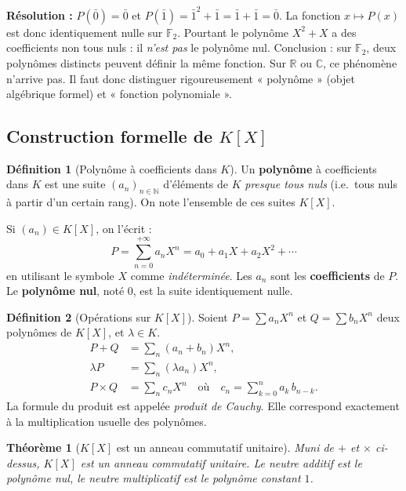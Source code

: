 \documentclass[12pt,a4paper]{report}
\newtheorem{theoreme}{Théorème}[section]
\theoremstyle{definition}
\newtheorem{definition}{Définition}[section]
\theoremstyle{remark}
\begin{document}
\textbf{Résolution :} $P(\bar{0}) = \bar{0}$ et $P(\bar{1}) = \bar{1}^2 + \bar{1} = \bar{1} + \bar{1} = \bar{0}$. La fonction $x \mapsto P(x)$ est donc identiquement nulle sur $\mathbb{F}_2$. Pourtant le polynôme $X^2 + X$ a des coefficients non tous nuls : il \emph{n'est pas} le polynôme nul. Conclusion : sur $\mathbb{F}_2$, deux polynômes distincts peuvent définir la même fonction. Sur $\mathbb{R}$ ou $\mathbb{C}$, ce phénomène n'arrive pas. Il faut donc distinguer rigoureusement « polynôme » (objet algébrique formel) et « fonction polynomiale ».

\subsection{Construction formelle de $K[X]$}

\begin{definition}[Polynôme à coefficients dans $K$]
Un \textbf{polynôme} à coefficients dans $K$ est une suite $(a_n)_{n \in \mathbb{N}}$ d'éléments de $K$ \emph{presque tous nuls} (i.e.\ tous nuls à partir d'un certain rang). On note l'ensemble de ces suites $K[X]$.

Si $(a_n) \in K[X]$, on l'écrit :
\[ P = \sum_{n=0}^{+\infty} a_n X^n = a_0 + a_1 X + a_2 X^2 + \cdots \]
en utilisant le symbole $X$ comme \emph{indéterminée}. Les $a_n$ sont les \textbf{coefficients} de $P$. Le \textbf{polynôme nul}, noté $0$, est la suite identiquement nulle.
\end{definition}

\begin{definition}[{Opérations sur $K[X]$}]
Soient $P = \sum a_n X^n$ et $Q = \sum b_n X^n$ deux polynômes de $K[X]$, et $\lambda \in K$.
\begin{align*}
P + Q &= \sum_{n} (a_n + b_n) X^n, \\
\lambda P &= \sum_{n} (\lambda a_n) X^n, \\
P \times Q &= \sum_{n} c_n X^n \quad \text{où} \quad c_n = \sum_{k=0}^{n} a_k\, b_{n-k}.
\end{align*}
La formule du produit est appelée \emph{produit de Cauchy}. Elle correspond exactement à la multiplication usuelle des polynômes.
\end{definition}

\begin{theoreme}[{$K[X]$ est un anneau commutatif unitaire}]
Muni de $+$ et $\times$ ci-dessus, $K[X]$ est un \emph{anneau commutatif unitaire}. Le neutre additif est le polynôme nul, le neutre multiplicatif est le polynôme constant $1$.
\end{theoreme}
\end{document}
